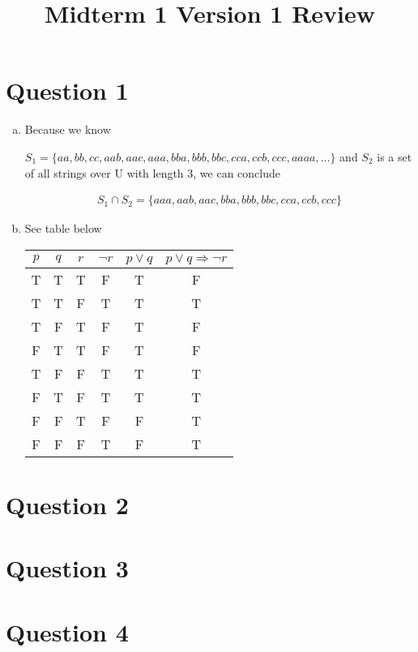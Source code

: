 \documentclass[12pt]{article}
\begin{document}
\title{Midterm 1 Version 1 Review}
\maketitle

\section*{Question 1}
\begin{enumerate}[a.]
    \item

    Because we know

    $S_1 = \{ aa,bb,cc,aab,aac,aaa,bba,bbb,bbc,cca,ccb,ccc,aaaa,\dots \}$
    and $S_2$ is a set of all strings over U with length 3, we can conclude

    \begin{align*}
        S_1 \cap S_2 = \{aaa,aab,aac,bba,bbb,bbc,cca,ccb,ccc\}
    \end{align*}

    \item

    See table below

    \begin{tabular}{|c|c|c|c|c|c|}
        \hline
        $p$ & $q$ & $r$ & $\neg r$ & $p \lor q$ & $p \lor q \Rightarrow \neg r$\\
        \hline
        T & T & T & F & T & F\\
        \hline
        T & T & F & T & T & T\\
        \hline
        T & F & T & F & T & F\\
        \hline
        F & T & T & F & T & F\\
        \hline
        T & F & F & T & T & T\\
        \hline
        F & T & F & T & T & T\\
        \hline
        F & F & T & F & F & T\\
        \hline
        F & F & F & T & F & T\\
        \hline
    \end{tabular}
\end{enumerate}

\section*{Question 2}

\section*{Question 3}

\section*{Question 4}
\end{document}
